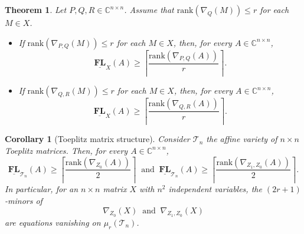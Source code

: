\documentclass[10pt,a4paper]{amsart}
\newtheorem{theorem}{Theorem}
\newtheorem{corollary}{Corollary}
\newcommand{\rank}{\mathrm{rank}}
\begin{document}
\begin{theorem}\label{thm:lower bound from displacement rank, two matrices}
     Let $P,Q,R \in \mathbb{C}^{n \times n}$. Assume that $\rank(\nabla_{Q}(M)) \leq r$ for each $M \in X$.
    \begin{itemize}
        \item [(\romannumeral1)] If $\rank(\nabla_{P,Q}(M)) \leq r$ for each $M \in X$, then, for every $A \in \mathbb{C}^{n \times n}$,
    \begin{equation*}
        \underline{\mathbf{FL}}_X(A) \geq \left\lceil \frac{\rank(\nabla_{P,Q}(A))}{r} \right\rceil.
    \end{equation*}
        \item [(\romannumeral2)] If $\rank(\nabla_{Q,R}(M)) \leq r$ for each $M \in X$, then, for every $A \in \mathbb{C}^{n \times n}$,
    \begin{equation*}
        \underline{\mathbf{FL}}_X(A) \geq \left\lceil \frac{\rank(\nabla_{Q,R}(A))}{r} \right\rceil.
    \end{equation*}
    \end{itemize}
\end{theorem}

\begin{corollary}[Toeplitz matrix structure]\label{cor:displacement rank of Toeplitz}
    Consider $\mathcal{T}_n$ the affine variety of $n \times n $ Toeplitz matrices. Then, for every $A \in \mathbb{C}^{n \times n}$, 
    \begin{equation*}
        \underline{\mathbf{FL}}_{\mathcal{T}_n}(A) \geq \left\lceil \frac{\rank(\nabla_{Z_0}(A))}{2} \right\rceil~\text{ and }~\underline{\mathbf{FL}}_{\mathcal{T}_n}(A) \geq \left\lceil \frac{\rank(\nabla_{Z_1,Z_0}(A))}{2} \right\rceil.
    \end{equation*}
    In particular, for an $n \times n$ matrix $X$ with $n^2$ independent variables, the $(2r+1)$-minors of 
    \begin{equation*}
        \nabla_{Z_0}(X)~\text{ and }~\nabla_{Z_1,Z_0}(X)
    \end{equation*}
    are equations vanishing on $\mu_r(\mathcal{T}_n)$.
\end{corollary}
\end{document}
